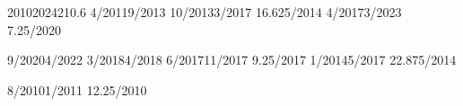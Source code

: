 \documentclass[11pt]{thyv}
\begin{document}
\begin{textblock}{5}
\begin{thyV}{2010}{2024}{21}{0.6\linewidth}
		 	{4/2011}{9/2013} 	{}
		 			{10/2013}{3/2017} 	{16.625/2014}
		 			{4/2017}{3/2023} 	{7.25/2020}

		 			{9/2020}{4/2022} 	{}
		 					{3/2018}{4/2018} 	{}
		 				{6/2017}{11/2017} 	{9.25/2017}
		 					{1/2014}{5/2017} 	{22.875/2014}

		 	{8/2010}{1/2011} 	{12.25/2010}
	\end{thyV}

	\end{textblock}



		
\end{document}

